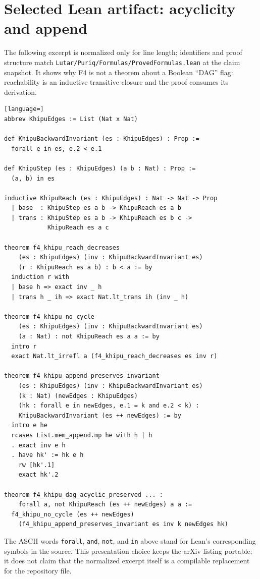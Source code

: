 \documentclass[11pt,letterpaper]{article}
\theoremstyle{definition}
\begin{document}
\appendix

\section{Selected Lean artifact: acyclicity and append}
\label{app:f4}

The following excerpt is normalized only for line length; identifiers and proof
structure match
\texttt{Lutar/Puriq/Formulas/ProvedFormulas.lean} at the claim snapshot. It
shows why F4 is not a theorem about a Boolean ``DAG'' flag: reachability is an
inductive transitive closure and the proof consumes its derivation.

\begin{lstlisting}[language=]
abbrev KhipuEdges := List (Nat x Nat)

def KhipuBackwardInvariant (es : KhipuEdges) : Prop :=
  forall e in es, e.2 < e.1

def KhipuStep (es : KhipuEdges) (a b : Nat) : Prop :=
  (a, b) in es

inductive KhipuReach (es : KhipuEdges) : Nat -> Nat -> Prop
  | base  : KhipuStep es a b -> KhipuReach es a b
  | trans : KhipuStep es a b -> KhipuReach es b c ->
            KhipuReach es a c

theorem f4_khipu_reach_decreases
    (es : KhipuEdges) (inv : KhipuBackwardInvariant es)
    (r : KhipuReach es a b) : b < a := by
  induction r with
  | base h => exact inv _ h
  | trans h _ ih => exact Nat.lt_trans ih (inv _ h)

theorem f4_khipu_no_cycle
    (es : KhipuEdges) (inv : KhipuBackwardInvariant es)
    (a : Nat) : not KhipuReach es a a := by
  intro r
  exact Nat.lt_irrefl a (f4_khipu_reach_decreases es inv r)

theorem f4_khipu_append_preserves_invariant
    (es : KhipuEdges) (inv : KhipuBackwardInvariant es)
    (k : Nat) (newEdges : KhipuEdges)
    (hk : forall e in newEdges, e.1 = k and e.2 < k) :
    KhipuBackwardInvariant (es ++ newEdges) := by
  intro e he
  rcases List.mem_append.mp he with h | h
  . exact inv e h
  . have hk' := hk e h
    rw [hk'.1]
    exact hk'.2

theorem f4_khipu_dag_acyclic_preserved ... :
    forall a, not KhipuReach (es ++ newEdges) a a :=
  f4_khipu_no_cycle (es ++ newEdges)
    (f4_khipu_append_preserves_invariant es inv k newEdges hk)
\end{lstlisting}

The ASCII words \texttt{forall}, \texttt{and}, \texttt{not}, and \texttt{in}
above stand for Lean's corresponding symbols in the source. This presentation
choice keeps the arXiv listing portable; it does not claim that the normalized
excerpt itself is a compilable replacement for the repository file.
\end{document}
